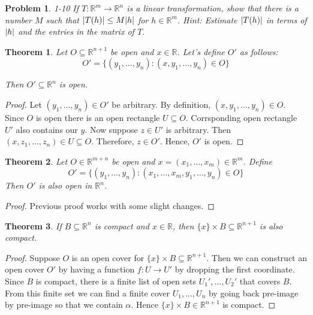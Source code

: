 \documentclass[12pt]{book}
\newcommand\T{\rule{0pt}{2.6ex}}
\newtheorem{theorem}{Theorem}
\newtheorem*{problem*}{Problem}
\begin{document}
\begin{problem*}
  \T 1-10 If $T: \mathbb{R}^m \to \mathbb{R}^n$ is a linear transformation, show that there is a number $M$ such that $\abs{T(h)} \le M\abs{h}$ for $h \in \mathbb{R}^m$. Hint: Estimate $\abs{T(h)}$ in terms of $\abs{h}$ and the entries in the matrix of $T$. 
\end{problem*}

\begin{theorem}
  Let $O \subseteq \mathbb{R}^{n+1}$ be open and $x\in \mathbb{R}$. Let's define $O'$ as follows:
  \[
  O' = \{(y_1, \ldots, y_n) : (x,y_1, \ldots, y_n) \in O \}
  \]

  Then $O' \subseteq \mathbb{R}^n$ is open. 
\end{theorem}

\begin{proof}
  Let $(y_1, \ldots, y_n) \in O'$ be arbitrary. By definition, $(x, y_1, \ldots, y_n) \in O$. Since $O$ is open there is an open rectangle $U \subseteq O$. Corrsponding open rectangle $U'$ also contains our $y$. Now suppose $z \in U'$ is arbitrary. Then $(x, z_1, \ldots, z_n) \in U \subseteq O$. Therefore, $z \in O'$. Hence, $O'$ is open. 
\end{proof}


\begin{theorem}
  Let $O \in \mathbb{R}^{m+n}$ be open and $x = (x_1, \ldots, x_m) \in \mathbb{R}^m$. Define
  \[
  O' = \{(y_1, \ldots, y_n) : (x_1, \ldots, x_m, y_1, \ldots, y_n) \in O \}
  \]
  Then $O'$ is also open in $\mathbb{R}^n$. 
\end{theorem}

\begin{proof}
  Previous proof works with some slight changes. 
\end{proof}

\begin{theorem}
If $B \subseteq \mathbb{R}^{n}$ is compact and $x \in \mathbb{R}$, then $\{x\}\times
B \subseteq \mathbb{R}^{n+1}$ is also compact.
\end{theorem}
\begin{proof}
Suppose $O$ is an open cover for $\{x\}\times B \subseteq \mathbb{R}^{n+1}$. Then we
can construct an open cover $O'$ by having a function $f:U \to U'$ by dropping
the first coordinate. Since $B$ is compact, there is a finite list of open sets
$U_1', \ldots, U_2'$ that covers $B$. From this finite set we can find a finite
cover $U_1, \ldots, U_n$ by going back pre-image by pre-image so that we contain
$\alpha$. Hence $\{x\}\times B \in \mathbb{R}^{n+1}$ is compact.
\end{proof}
\end{document}
